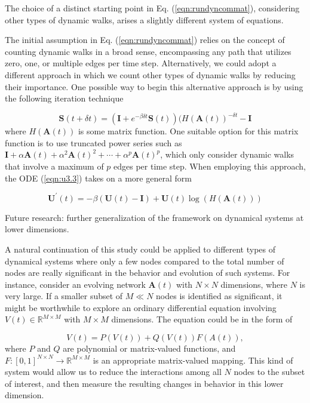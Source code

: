 \begin{highlightedParagraphC}
 
The choice of a distinct starting point in Eq. (\ref{eqn:rundyncommat}), considering other types of dynamic walks, arises a slightly different system of equations.

\end{highlightedParagraphC}

The initial assumption in Eq. (\ref{eqn:rundyncommat}) relies on the concept of counting dynamic walks in a broad sense, encompassing any path that utilizes zero, one, or multiple edges per time step. Alternatively, we could adopt a different approach in which we count other types of dynamic walks by reducing their importance. One possible way to begin this alternative approach is by using the following iteration technique

\begin{equation}
\label{eqn:remarks1}
    \mathbf{S}(t + \delta t) = (\mathbf{I} + e^{-\beta\delta t}\mathbf{S}(t)) (H(\mathbf{A}(t))^{-\delta t} - \mathbf{I}
\end{equation}
where $H(\mathbf{A}(t))$ is some matrix function. One suitable option for this matrix function is to use truncated power series such as $\mathbf{I} + \alpha \mathbf{A}(t) + \alpha^2 \mathbf{A}(t)^2 + \cdots + \alpha^p \mathbf{A}(t)^p$, which only consider dynamic walks that involve a maximum of $p$ edges per time step. When employing this approach, the ODE (\ref{eqn:u3.3}) takes on a more general form 

\begin{equation}
\label{eqn:remarks2}
    \mathbf{U^{\prime}}(t) = -\beta (\mathbf{U}(t) - \mathbf{I}) + \mathbf{U}(t)\log (H(\mathbf{A}(t)))
\end{equation}

\begin{highlightedParagraphC}
 
Future research: further generalization of the framework on dynamical systems at lower dimensions.

\end{highlightedParagraphC}

A natural continuation of this study could be applied to different types of dynamical systems where only a few nodes compared to the total number of nodes are really significant in the behavior and evolution of such systems. For instance, consider an evolving network $\mathbf{A}(t)$ with $N \times N$ dimensions, where $N$ is very large. If a smaller subset of $M\ll N$ nodes is identified as significant, it might be worthwhile to explore an ordinary differential equation involving $V(t)\in \mathbb{R}^{M\times M}$ with $M\times M$ dimensions. The equation could be in the form of 

$$V(t)=P(V(t)) + Q(V(t))F(A(t)),$$ where $P$ and $Q$ are polynomial or matrix-valued functions, and $F: [0, 1]^{N×N} \to \mathbb{R}^{M\times M}$ is an appropriate matrix-valued mapping. This kind of system would allow us to reduce the interactions among all $N$ nodes to the subset of interest, and then measure the resulting changes in behavior in this lower dimension.




